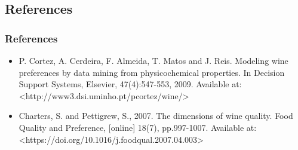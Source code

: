 \documentclass{beamer}
\begin{document}
	\subsection{References}
	\begin{frame}
		\frametitle{References}
		\begin{itemize}
			\item P. Cortez, A. Cerdeira, F. Almeida, T. Matos and J. Reis. Modeling wine preferences by data mining from physicochemical properties. In Decision Support Systems, Elsevier, 47(4):547-553, 2009.   Available at: \textless http://www3.dsi.uminho.pt/pcortez/wine/\textgreater
			\item Charters, S. and Pettigrew, S., 2007. The dimensions of wine quality. Food Quality and Preference, [online] 18(7), pp.997-1007. Available at: \textless https://doi.org/10.1016/j.foodqual.2007.04.003\textgreater
		\end{itemize}
	\end{frame}
	
	
\end{document}
